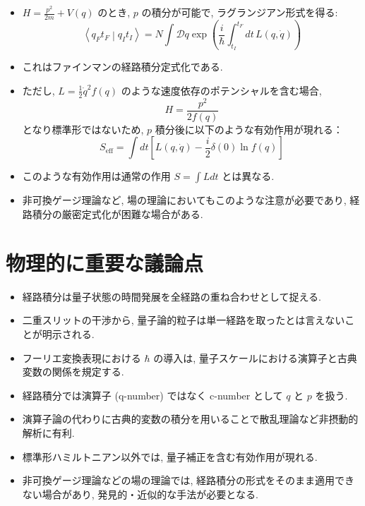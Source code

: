 \documentclass[a4paper,12pt]{article}
\newcommand{\braket}[2]{\left\langle #1\middle|#2\right\rangle}
\begin{document}
\begin{itemize}
\begin{equation*}
    \end{equation*}
    \item $\displaystyle H=\frac{p^2}{2m}+V(q)$ のとき, $p$ の積分が可能で, ラグランジアン形式を得る:
    \begin{equation*}
        \braket{q_{F}t_{F}}{q_{I}t_{I}} = N\int \mathcal{D}q \exp\left( \frac{i}{\hbar}\int_{t_I}^{t_F} dt\, L(q, \dot{q}) \right)
    \end{equation*}
    \item これはファインマンの経路積分定式化である.
    \item ただし, $L=\frac{1}{2}\dot{q}^2f(q)$ のような速度依存のポテンシャルを含む場合,
    \begin{equation*}
        H = \frac{p^2}{2f(q)}
    \end{equation*}
    となり標準形ではないため, $p$ 積分後に以下のような有効作用が現れる：
    \begin{equation*}
        S_{\mathrm{eff}} = \int dt \left[ L(q, \dot{q}) - \frac{i}{2}\delta(0)\ln f(q) \right]
    \end{equation*}
    \item このような有効作用は通常の作用 $S=\int L dt$ とは異なる.
    \item 非可換ゲージ理論など, 場の理論においてもこのような注意が必要であり, 経路積分の厳密定式化が困難な場合がある.
\end{itemize}

\section*{物理的に重要な議論点}
\begin{itemize}
    \item 経路積分は量子状態の時間発展を全経路の重ね合わせとして捉える.
    \item 二重スリットの干渉から, 量子論的粒子は単一経路を取ったとは言えないことが明示される.
    \item フーリエ変換表現における $\hbar$ の導入は, 量子スケールにおける演算子と古典変数の関係を規定する.
    \item 経路積分では演算子 (q-number) ではなく c-number として $q$ と $p$ を扱う.
    \item 演算子論の代わりに古典的変数の積分を用いることで散乱理論など非摂動的解析に有利.
    \item 標準形ハミルトニアン以外では, 量子補正を含む有効作用が現れる.
    \item 非可換ゲージ理論などの場の理論では, 経路積分の形式をそのまま適用できない場合があり, 発見的・近似的な手法が必要となる.
\end{itemize}
\color{black}
\end{document}
